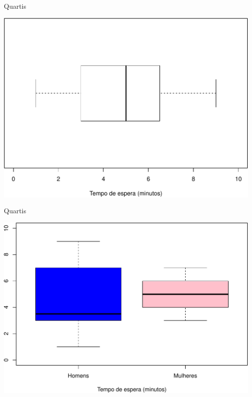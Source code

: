 \documentclass[10pt]{beamer}\usepackage[]{graphicx}\usepackage[]{color}
\newenvironment{knitrout}{}{} %
\theoremstyle{definition}
\begin{document}
\begin{frame}{Quartis}
\begin{knitrout}\footnotesize
{}\color{fgcolor}

{\centering \includegraphics[width=.8\textwidth]{figure/quartis1-1} 

}



\end{knitrout}
\end{frame}

\begin{frame}{Quartis}
\begin{knitrout}\footnotesize
{}\color{fgcolor}

{\centering \includegraphics[width=.8\textwidth]{figure/quartis2-1} 

}



\end{knitrout}
\end{frame}
\end{document}
